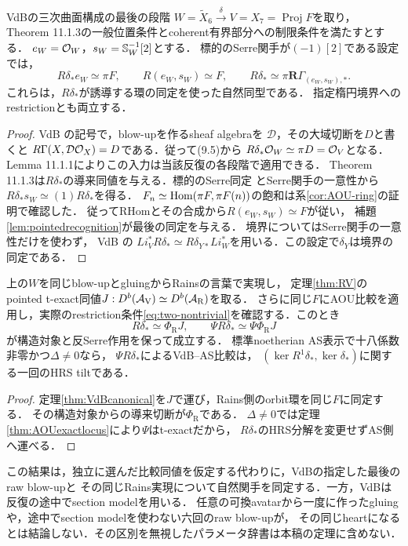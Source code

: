 \begin{theorem}[VdBの最後の比較関手は反標準導来切断である]\label{thm:VdBcanonical}
VdBの三次曲面構成の最後の段階
$W=\widetilde X_6\xrightarrow{\delta}V=X_7=\operatorname{Proj}F$を取り，
Theorem 11.1.3の一般位置条件とcoherent有界部分への制限条件を満たすとする．
$e_W=\mathcal O_W$，$s_W=\mathbb S_W^{-1}[2]$とする．
標的のSerre関手が$(-1)[2]$である設定では，
\[
 R\delta_*e_W\simeq\pi F,\qquad
 R(e_W,s_W)\simeq F,\qquad
 \boxed{R\delta_*\simeq\pi\mathbf R\Gamma_{(e_W,s_W),*}}.
\]
これらは，$R\delta_*$が誘導する環の同定を使った自然同型である．
指定楕円境界へのrestrictionとも両立する．
\end{theorem}
\begin{proof}
VdB \cite[(9.5), Proposition 9.2.3(1)]{VdB}の記号で，blow-upを作るsheaf algebraを
$\mathcal D$，その大域切断を$D$と書くと
$R\Gamma(X,\mathcal D\mathcal O_X)=D$である．従って(9.5)から
$R\delta_*\mathcal O_W\simeq\pi D=\mathcal O_V$となる．
Lemma 11.1.1によりこの入力は当該反復の各段階で適用できる．
Theorem 11.1.3は$R\delta_*$の導来同値を与える．標的のSerre同定
\cite[Lemma 9.2]{AOU}とSerre関手の一意性から
$R\delta_*s_W\simeq(1)R\delta_*$を得る．
$F_n\simeq\operatorname{Hom}(\pi F,\pi F(n))$の飽和は系\ref{cor:AOU-ring}の証明で確認した．
従ってRHomとその合成から$R(e_W,s_W)\simeq F$が従い，
補題\ref{lem:pointedrecognition}が最後の同定を与える．
境界についてはSerre関手の一意性だけを使わず，
VdB \cite[Proposition 9.1.8, (9.11)]{VdB}の
$Li_V^*R\delta_*\simeq R\delta_{Y*}Li_W^*$を用いる．この設定で$\delta_Y$は境界の同定である．
\end{proof}

\begin{corollary}[同じ表示での四者の接続]\label{cor:fourfunctors}
上の$W$を同じblow-upとgluingからRainsの言葉で実現し，
定理\ref{thm:RV}のpointed t-exact同値$J:D^b(\mathcal A_{\mathrm V})\simeq D^b(\mathcal A_{\mathrm R})$を取る．
さらに同じ$F$にAOU比較を適用し，実際のrestriction条件\eqref{eq:two-nontrivial}を確認する．このとき
\[
 R\delta_*\simeq\Phi_{\mathrm R}J,\qquad
 \Psi R\delta_*\simeq\Psi\Phi_{\mathrm R}J
\]
が構造対象と反Serre作用を保って成立する．
標準noetherian AS表示で十八係数非零かつ$\Delta\ne0$なら，
$\Psi R\delta_*$によるVdB--AS比較は，
$(\ker R^1\delta_*,\ker\delta_*)$に関する一回のHRS tiltである．
\end{corollary}
\begin{proof}
定理\ref{thm:VdBcanonical}を$J$で運び，Rains側のorbit環を同じ$F$に同定する．
その構造対象からの導来切断が$\Phi_{\mathrm R}$である．
$\Delta\ne0$では定理\ref{thm:AOUexactlocus}により$\Psi$はt-exactだから，
$R\delta_*$のHRS分解を変更せずAS側へ運べる．
\end{proof}
\begin{remark}[同じデータの意味と残る範囲]
この結果は，独立に選んだ比較同値を仮定する代わりに，VdBの指定した最後のraw blow-upと
その同じRains実現について自然関手を同定する．一方，VdBは反復の途中でsection modelを用いる．
任意の可換avatarから一度に作ったgluingや，途中でsection modelを使わない六回のraw blow-upが，
その同じheartになるとは結論しない．その区別を無視したパラメータ辞書は本稿の定理に含めない．
\end{remark}

